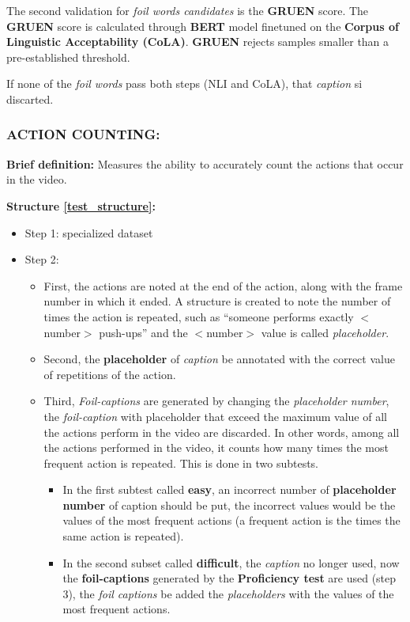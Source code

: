 The second validation for \textit{foil words candidates} is the \textbf{GRUEN} score. The \textbf{GRUEN} score is calculated through \textbf{BERT} model finetuned on the \textbf{Corpus of Linguistic Acceptability (CoLA)}. \textbf{GRUEN} rejects samples smaller than a pre-established threshold.

If none of the \textit{foil words} pass both steps (NLI and CoLA), that \textit{caption} si discarted.

\subsubsection{ACTION COUNTING:}
\textbf{Brief definition:} Measures the ability to accurately count the actions that occur in the video.

\textbf{Structure \ref{test_structure}:}
\begin{itemize}
\item Step 1: specialized dataset
\item Step 2:
\begin{itemize}
\item First, the actions are noted at the end of the action, along with the frame number in which it ended. A structure is created to note the number of times the action is repeated, such as “someone performs exactly $<$number$>$ push-ups” and the $<$number$>$ value is called \textit{placeholder}.
\item Second, the \textbf{placeholder} of \textit{caption} be annotated with the correct value of repetitions of the action.
\item Third, \textit{Foil-captions} are generated by changing the \textit{placeholder number}, the \textit{foil-caption} with placeholder that exceed the maximum value of all the actions perform in the video are discarded. In other words, among all the actions performed in the video, it counts how many times the most frequent action is repeated. This is done in two subtests.
\begin{itemize}
\item In the first subtest called \textbf{easy}, an incorrect number of \textbf{placeholder number} of caption should be put, the incorrect values would be the values of the most frequent actions (a frequent action is the times the same action is repeated).
\item In the second subset called \textbf{difficult}, the \textit{caption} no longer used, now the \textbf{foil-captions} generated by the \textbf{Proficiency test} are used (step 3), the \textit{foil captions} be added the \textit{placeholders} with the values of the most frequent actions.

\end{itemize}
\end{itemize}
\end{itemize}
